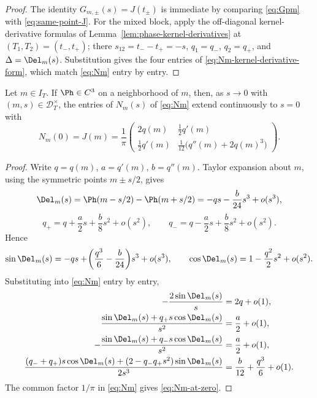 \begin{proof}
The identity \(G_{m,\pm}(s) = J(t_\pm)\) is immediate by comparing
\eqref{eq:Gpm} with \eqref{eq:same-point-J}.  For the mixed block,
apply the off-diagonal kernel-derivative formulas of
Lemma~\ref{lem:phase-kernel-derivatives} at
\((T_1, T_2) = (t_-, t_+)\); there \(s_{12} = t_- - t_+ = -s\),
\(q_1 = q_-\), \(q_2 = q_+\), and \(\Delta = \Del_m(s)\).
Substitution gives the four entries of
\eqref{eq:Nm-kernel-derivative-form}, which match \eqref{eq:Nm} entry
by entry.
\end{proof}

\begin{lemma}
\label{lem:Nm-removable-singularity}
Let \(m\in I_T\).  If \(\Ph\in C^3\) on a neighborhood of \(m\), then,
as \(s\to 0\) with \((m,s)\in\mathcal D_T^\times\), the entries of
\(N_m(s)\) of \eqref{eq:Nm} extend continuously to \(s=0\) with
\begin{equation}
\label{eq:Nm-at-zero}
        N_m(0) = J(m)
        = \frac1\pi
        \begin{pmatrix}
        2q(m) & \tfrac12 q'(m)\\[0.8ex]
        \tfrac12 q'(m) & \tfrac1{12}\bigl(q''(m)+2q(m)^3\bigr)
        \end{pmatrix}.
\end{equation}
\end{lemma}

\begin{proof}
Write \(q = q(m)\), \(a = q'(m)\), \(b = q''(m)\).  Taylor expansion
about \(m\), using the symmetric points \(m\pm s/2\), gives
\[
        \Del_m(s)
        = \Ph(m-s/2)-\Ph(m+s/2)
        = -qs - \frac{b}{24}s^3 + o(s^3),
\]
\[
        q_+ = q + \frac{a}{2}s + \frac{b}{8}s^2 + o(s^2),
        \qquad
        q_- = q - \frac{a}{2}s + \frac{b}{8}s^2 + o(s^2).
\]
Hence
\[
        \sin\Del_m(s)
        = -qs + \!\left(\frac{q^3}{6}-\frac{b}{24}\right)\!s^3
          + o(s^3),
        \qquad
        \cos\Del_m(s) = 1 - \frac{q^2}{2}s^2 + o(s^2).
\]
Substituting into \eqref{eq:Nm} entry by entry,
\begin{align*}
        -\frac{2\sin\Del_m(s)}{s}
        &= 2q + o(1),\\
        \frac{\sin\Del_m(s)+q_+ s\cos\Del_m(s)}{s^2}
        &= \frac{a}{2} + o(1),\\
        -\frac{\sin\Del_m(s)+q_- s\cos\Del_m(s)}{s^2}
        &= \frac{a}{2} + o(1),\\
        \frac{(q_-+q_+)s\cos\Del_m(s)+(2-q_- q_+ s^2)\sin\Del_m(s)}{2s^3}
        &= \frac{b}{12}+\frac{q^3}{6}+o(1).
\end{align*}
The common factor \(1/\pi\) in \eqref{eq:Nm} gives
\eqref{eq:Nm-at-zero}.
\end{proof}


